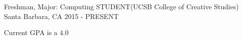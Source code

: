 \begin{cventries}
  \cventry
    {Freshman, Major: Computing}
    {STUDENT(UCSB College of Creative Studies)}
    {Santa Barbara, CA}
    {2015 - PRESENT}
    {
      \begin{cvitems}
        \item {Current GPA is a 4.0}
      \end{cvitems}
    }
\end{cventries}
